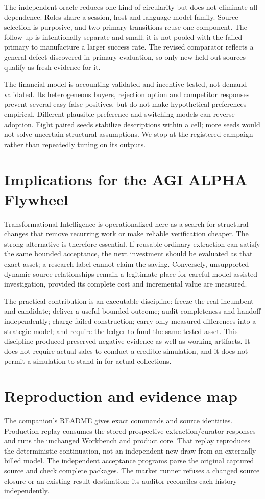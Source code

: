 \documentclass[11pt,a4paper]{article}
\begin{document}
The independent oracle reduces one kind of circularity but does not eliminate all dependence. Roles share a session, host and language-model family. Source selection is purposive, and two primary transitions reuse one component. The follow-up is intentionally separate and small; it is not pooled with the failed primary to manufacture a larger success rate. The revised comparator reflects a general defect discovered in primary evaluation, so only new held-out sources qualify as fresh evidence for it.

The financial model is accounting-validated and incentive-tested, not demand-validated. Its heterogeneous buyers, rejection option and competitor responses prevent several easy false positives, but do not make hypothetical preferences empirical. Different plausible preference and switching models can reverse adoption. Eight paired seeds stabilize descriptions within a cell; more seeds would not solve uncertain structural assumptions. We stop at the registered campaign rather than repeatedly tuning on its outputs.

\section{Implications for the AGI ALPHA Flywheel}
Transformational Intelligence is operationalized here as a search for structural changes that remove recurring work or make reliable verification cheaper. The strong alternative is therefore essential. If reusable ordinary extraction can satisfy the same bounded acceptance, the next investment should be evaluated as that exact asset; a research label cannot claim the saving. Conversely, unsupported dynamic source relationships remain a legitimate place for careful model-assisted investigation, provided its complete cost and incremental value are measured.

The practical contribution is an executable discipline: freeze the real incumbent and candidate; deliver a useful bounded outcome; audit completeness and handoff independently; charge failed construction; carry only measured differences into a strategic model; and require the ledger to fund the same tested asset. This discipline produced preserved negative evidence as well as working artifacts. It does not require actual sales to conduct a credible simulation, and it does not permit a simulation to stand in for actual collections.



\appendix
\section{Reproduction and evidence map}
The companion's README gives exact commands and source identities. Production replay consumes the stored prospective extraction/curator responses and runs the unchanged Workbench and product core. That replay reproduces the deterministic continuation, not an independent new draw from an externally billed model. The independent acceptance programs parse the original captured source and check complete packages. The market runner refuses a changed source closure or an existing result destination; its auditor reconciles each history independently.
\end{document}
